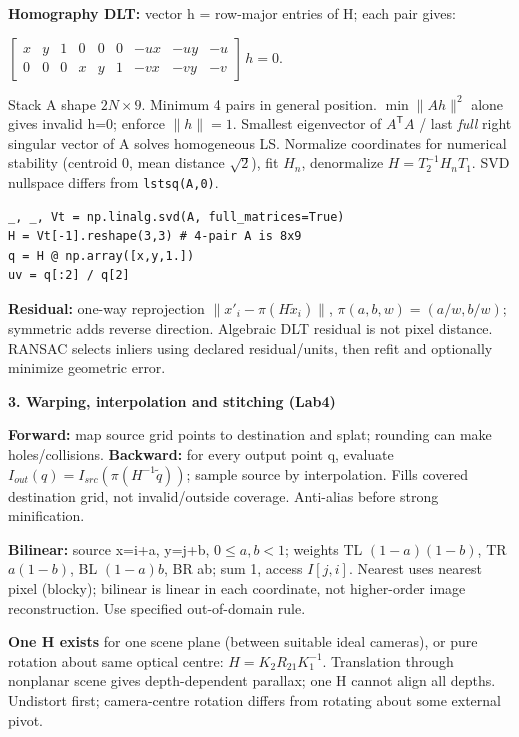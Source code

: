 \documentclass[a4paper]{article}
\newcommand{\key}[1]{\textbf{#1}}
\newcommand{\Topic}[1]{\par\vspace{1.7pt}\noindent
  {\fontsize{7.7}{8.0}\selectfont\bfseries #1}\par\vspace{0.3pt}}
\newcommand{\eq}[1]{\par\noindent\mbox{\(\displaystyle #1\)}\par}
\newcommand{\smat}[1]{\left[\begin{smallmatrix}#1\end{smallmatrix}\right]}
\newcommand{\norm}[1]{\lVert #1\rVert}
\newcommand{\trans}{^{\mathsf T}}
\newcommand{\inv}{^{-1}}
\newcounter{sheet}
\newcounter{sheetcolumn}
\newlength{\colwidth}
\newenvironment{sheetcol}[1][7.0]{\stepcounter{sheetcolumn}
  \begin{lrbox}{\columnbox}\begin{minipage}[t]{\colwidth}\vspace{0pt}
  \fontsize{#1}{\dimexpr#1pt+0.6pt\relax}\selectfont}
  {\end{minipage}\end{lrbox}
  \typeout{CV1COL|\thesheet|\thesheetcolumn|\the\dimexpr\ht\columnbox+\dp\columnbox\relax}
  \usebox{\columnbox}\ignorespacesafterend}
\begin{document}
\begin{sheetcol}[6.7]
\key{Homography DLT:} vector h = row-major entries of H; each pair gives:
\eq{\smat{x&y&1&0&0&0&-ux&-uy&-u\\
 0&0&0&x&y&1&-vx&-vy&-v}\,h=0.}
Stack A shape \(2N\!\times\!9\). Minimum 4 pairs in general position. \(\min\norm{Ah}^2\) alone gives invalid h=0; enforce \(\norm h=1\). Smallest eigenvector of \(A\trans A\) / last \emph{full} right singular vector of A solves homogeneous LS. Normalize coordinates for numerical stability (centroid 0, mean distance \(\sqrt2\)), fit \(H_n\), denormalize \(H=T_2\inv H_nT_1\). SVD nullspace differs from \texttt{lstsq(A,0)}.
\begin{lstlisting}
_, _, Vt = np.linalg.svd(A, full_matrices=True)
H = Vt[-1].reshape(3,3) # 4-pair A is 8x9
q = H @ np.array([x,y,1.])
uv = q[:2] / q[2]
\end{lstlisting}
\key{Residual:} one-way reprojection \(\norm{x'_i-\pi(H\tilde x_i)}\), \(\pi(a,b,w)=(a/w,b/w)\); symmetric adds reverse direction. Algebraic DLT residual is not pixel distance. RANSAC selects inliers using declared residual/units, then refit and optionally minimize geometric error.

\Topic{3. Warping, interpolation and stitching (Lab4)}
\key{Forward:} map source grid points to destination and splat; rounding can make holes/collisions. \key{Backward:} for every output point q, evaluate \(I_{out}(q)=I_{src}(\pi(H\inv\tilde q))\); sample source by interpolation. Fills covered destination grid, not invalid/outside coverage. Anti-alias before strong minification.

\key{Bilinear:} source x=i+a, y=j+b, \(0\le a,b<1\); weights TL \((1-a)(1-b)\), TR \(a(1-b)\), BL \((1-a)b\), BR ab; sum 1, access \(I[j,i]\). Nearest uses nearest pixel (blocky); bilinear is linear in each coordinate, not higher-order image reconstruction. Use specified out-of-domain rule.

\key{One H exists} for one scene plane (between suitable ideal cameras), or pure rotation about same optical centre: \(H=K_2R_{21}K_1\inv\). Translation through nonplanar scene gives depth-dependent parallax; one H cannot align all depths. Undistort first; camera-centre rotation differs from rotating about some external pivot.


\end{sheetcol}
\end{document}
